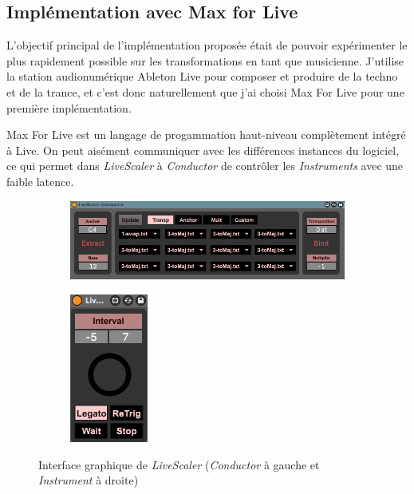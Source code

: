 \subsection{Implémentation avec Max for Live}

L'objectif principal de l'implémentation proposée était de pouvoir expérimenter le plus rapidement possible sur les transformations en tant que musicienne. J'utilise la station audionumérique Ableton Live pour composer et produire de la techno et de la trance, et c'est donc naturellement que j'ai choisi Max For Live pour une première implémentation. 

Max For Live est un langage de progammation haut-niveau complètement intégré à Live. On peut aisément communiquer avec les différences instances du logiciel, ce qui permet dans \emph{LiveScaler} à \emph{Conductor} de contrôler les \emph{Instruments} avec une faible latence.

\begin{figure}[htbp]
  \centering
  \begin{subfigure}{0.86\textwidth}
    \includegraphics{Figures/LS-Conductor-UI.png}
  \end{subfigure}
  \begin{subfigure}{0.13\textwidth}
    \includegraphics{Figures/LS-Instrument-UI.png}
    
  \end{subfigure}
  \caption{Interface graphique de \emph{LiveScaler} (\emph{Conductor} à gauche et \emph{Instrument} à droite)}
\end{figure}